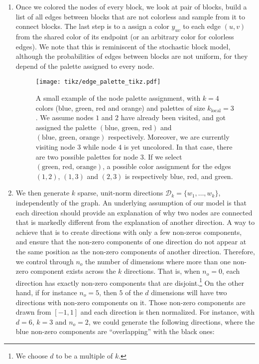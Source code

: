 \begin{enumerate}[1),leftmargin=*]
\item
Once we colored the nodes of every block, we look at pair
of blocks, build a list of all edges between blocks that are not colorless and sample from it to
connect blocks. The last step is to a assign a color $y_{uv}$ to each edge $(u,v)$ from the shared color of its
endpoint (or an arbitrary color for colorless edges). We note that this is reminiscent of the stochastic
block model, although the probabilities of edges between blocks are not uniform, for they depend of
the palette assigned to every node.
\begin{figure}[bht]
  \centering
  \texttt{[image: tikz/edge\_palette\_tikz.pdf]}
  \caption{A small example of the node palette assignment, with $k=4$ colors (blue, green, red and
    orange) and palettes of size $k_\mathrm{local}=3$. We assume nodes $1$ and $2$ have already been
    visited, and got assigned the palette $(\text{blue, green, red})$ and $(\text{blue, green,
    orange})$ respectively. Moreover, we are currently visiting node $3$ while node $4$ is yet uncolored. In that
    case, there are two possible palettes for node $3$. If we select $(\text{green, red, orange})$, a
    possible color assignment for the edges $(1,2)$, $(1, 3)$ and $(2, 3)$ is respectively blue,
    red, and green.
  \label{fig:edge_palette}}
\end{figure}

  \item 
We then generate $k$ sparse, unit-norm directions $\mathcal{D}_k=\{w_1, \ldots, w_k\}$,
independently of the graph. An underlying assumption of our model is that each direction should
provide an explanation of why two nodes are connected that is markedly different from the
explanation of another direction. A way to achieve that is to create directions with only a few
non-zeros components, and ensure that the non-zero components of one direction do not appear at the
same position as the non-zero components of another direction. Therefore, we control through $n_o$
the number of dimensions where more than one non-zero component exists across the $k$ directions.
That is, when $n_o = 0$, each direction has exactly  non-zero components that are
disjoint.\footnote{We choose $d$ to be a multiple of $k$.} On the other hand, if for instance $n_o=5$,
then $5$ of the $d$ dimensions will have two directions with non-zero components on it. Those
non-zero components are drawn \uar{} from $[-1, 1]$ and each direction is then normalized. For
instance, with $d=6$, $k=3$ and $n_o=2$, we could generate the following directions, where the blue
non-zero components are \enquote{overlapping} with the black ones:


\end{enumerate}
